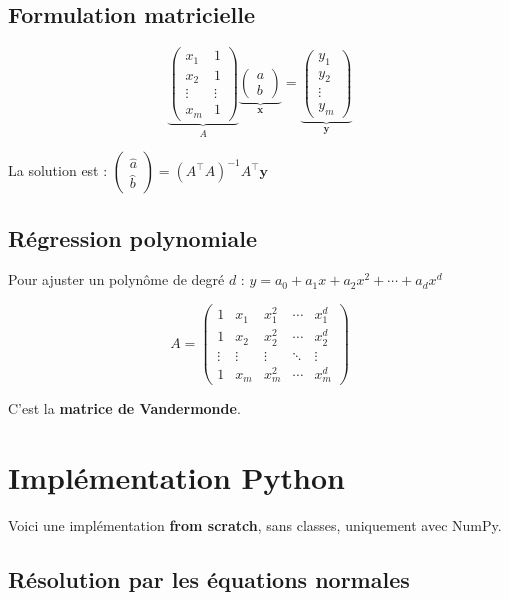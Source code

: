 \documentclass[12pt,a4paper]{article}
\newcommand{\T}{^\top}
\begin{document}
\subsection{Formulation matricielle}

\[
\underbrace{\begin{pmatrix} x_1 & 1 \\ x_2 & 1 \\ \vdots & \vdots \\ x_m & 1 \end{pmatrix}}_{A}
\underbrace{\begin{pmatrix} a \\ b \end{pmatrix}}_{\mathbf{x}}
= \underbrace{\begin{pmatrix} y_1 \\ y_2 \\ \vdots \\ y_m \end{pmatrix}}_{\mathbf{y}}
\]

La solution est : $\begin{pmatrix} \hat{a} \\ \hat{b} \end{pmatrix} = (A\T A)^{-1} A\T \mathbf{y}$

\subsection{Régression polynomiale}

Pour ajuster un polynôme de degré $d$ : $y = a_0 + a_1 x + a_2 x^2 + \cdots + a_d x^d$

\[
A = \begin{pmatrix}
1 & x_1 & x_1^2 & \cdots & x_1^d \\
1 & x_2 & x_2^2 & \cdots & x_2^d \\
\vdots & \vdots & \vdots & \ddots & \vdots \\
1 & x_m & x_m^2 & \cdots & x_m^d
\end{pmatrix}
\]

C'est la \textbf{matrice de Vandermonde}.

\newpage
\section{Implémentation Python}

Voici une implémentation \textbf{from scratch}, sans classes, uniquement avec NumPy.

\subsection{Résolution par les équations normales}
\end{document}
